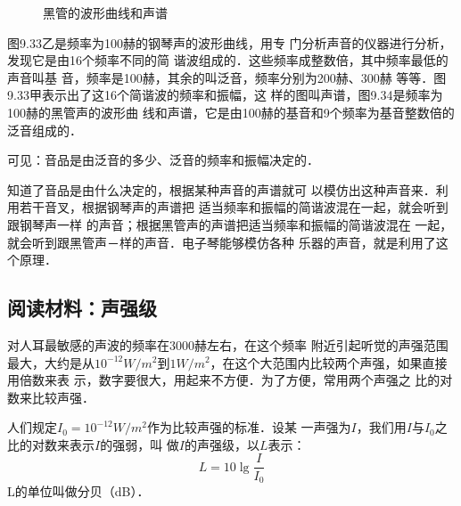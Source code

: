 \begin{figure}[H]
\begin{floatrow}
{
        }{\caption{黑管的波形曲线和声谱}}
    \end{floatrow}
\end{figure}



图9.33乙是频率为100赫的钢琴声的波形曲线，用专
门分析声音的仪器进行分析，发现它是由16个频率不同的简
谐波组成的．这些频率成整数倍，其中频率最低的声音叫基
音，频率是100赫，其余的叫泛音，频率分别为200赫、300赫
等等．图9.33甲表示出了这16个简谐波的频率和振幅，这
样的图叫声谱，图9.34是频率为100赫的黑管声的波形曲
线和声谱，它是由100赫的基音和9个频率为基音整数倍的
泛音组成的．

可见：音品是由泛音的多少、泛音的频率和振幅决定的．

知道了音品是由什么决定的，根据某种声音的声谱就可
以模仿出这种声音来．利用若干音叉，根据钢琴声的声谱把
适当频率和振幅的简谐波混在一起，就会听到跟钢琴声一样
的声音；根据黑管声的声谱把适当频率和振幅的简谐波混在
一起，就会听到跟黑管声－样的声音．电子琴能够模仿各种
乐器的声音，就是利用了这个原理．


\subsection*{阅读材料：声强级}
对人耳最敏感的声波的频率在3000赫左右，在这个频率
附近引起听觉的声强范围最大，大约是从$10^{-12}{ W}/{ m^2}$到$1{ W}/{ m^2}$，在这个大范围内比较两个声强，如果直接用倍数来表
示，数字要很大，用起来不方便．为了方便，常用两个声强之
比的对数来比较声强．

人们规定$I_0=10^{-12}{ W}/{ m^2}$作为比较声强的标准．设某
一声强为$I$，我们用$I$与$I_0$之比的对数来表示$I$的强弱，叫
做$I$的声强级，以$L$表示：
\[L=10\lg \frac{I}{I_0} \]
L的单位叫做分贝（dB）．

